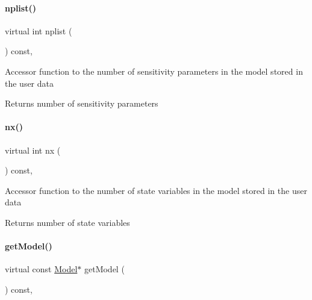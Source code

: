 \paragraph{\texorpdfstring{nplist()}{nplist()}}
{\footnotesize\ttfamily virtual int nplist (\begin{DoxyParamCaption}{ }\end{DoxyParamCaption}) const\hspace{0.3cm}{\ttfamily [protected]}, {}}

Accessor function to the number of sensitivity parameters in the model stored in the user data

\begin{DoxyReturn}{Returns}
number of sensitivity parameters 
\end{DoxyReturn}
\mbox{\label{classamici_1_1_solver_a86a18c4e461de76881b6af72e4feb8d9}} 
\paragraph{\texorpdfstring{nx()}{nx()}}
{\footnotesize\ttfamily virtual int nx (\begin{DoxyParamCaption}{ }\end{DoxyParamCaption}) const\hspace{0.3cm}{\ttfamily [protected]}, {}}

Accessor function to the number of state variables in the model stored in the user data

\begin{DoxyReturn}{Returns}
number of state variables 
\end{DoxyReturn}
\mbox{\label{classamici_1_1_solver_a3ea583e4e53b188c54f426f1bc652a0f}} 
\paragraph{\texorpdfstring{get\+Model()}{getModel()}}
{\footnotesize\ttfamily virtual const \mbox{\hyperlink{classamici_1_1_model}{Model}}$\ast$ get\+Model (\begin{DoxyParamCaption}{ }\end{DoxyParamCaption}) const\hspace{0.3cm}{\ttfamily [protected]}, {}}

